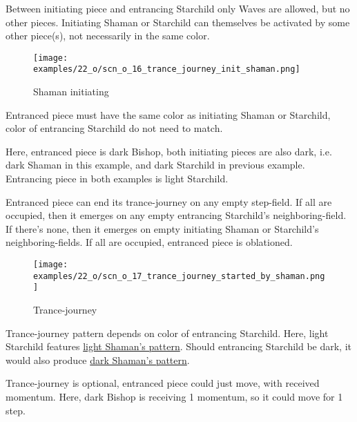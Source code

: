 Between initiating piece and entrancing Starchild only Waves are allowed, but no other pieces.
Initiating Shaman or Starchild can themselves be activated by some other piece(s), not necessarily
in the same color.

\vspace*{-0.1\baselineskip}
\noindent
\begin{wrapfigure}[10]{l}{0.4\textwidth}
\centering
\texttt{[image: examples/22\_o/scn\_o\_16\_trance\_journey\_init\_shaman.png]}
\caption{Shaman initiating}
\label{fig:scn_o_16_trance_journey_init_shaman}
\end{wrapfigure}
Entranced piece must have the same color as initiating Shaman or Starchild, color of
entrancing Starchild do not need to match.

Here, entranced piece is dark Bishop, both initiating pieces are also dark, i.e. dark Shaman
in this example, and dark Starchild in previous example. Entrancing piece in both examples
is light Starchild.

Entranced piece can end its trance-journey on any empty step-field. If all are occupied, then it emerges
on any empty entrancing Starchild's neighboring-field. If there's none, then it emerges on empty initiating
Shaman or Starchild's neighboring-fields. If all are occupied, entranced piece is oblationed.

\clearpage %

\vspace*{-2.1\baselineskip}
\noindent
\begin{figure}[!h]
\texttt{[image: examples/22\_o/scn\_o\_17\_trance\_journey\_started\_by\_shaman.png]}
\caption{Trance-journey}
\label{fig:scn_o_17_trance_journey_started_by_shaman}
\end{figure}

Trance-journey pattern depends on color of entrancing Starchild. Here, light Starchild features
\hyperref[fig:scn_cot_14_light_shaman_trance_journey]{light Shaman's pattern}. Should entrancing
Starchild be dark, it would also produce
\hyperref[fig:scn_cot_16_dark_shaman_trance_journey]{dark Shaman's pattern}.

Trance-journey is optional, entranced piece could just move, with received momentum.
Here, dark Bishop is receiving 1 momentum, so it could move for 1 step.

